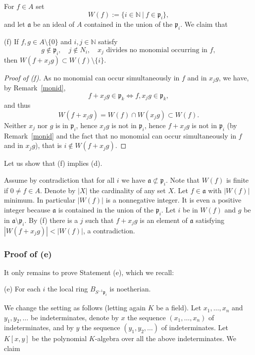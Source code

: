 \documentclass[parskip=half,fontsize=12pt]{scrartcl}%
\newcommand{\mf}{\mathfrak}
\newcommand{\aaa}{\mf a}
\newcommand{\ppp}{\mf p}
\begin{document}
For $f\in A$ set 
$$
W(f):=\{i\in\mathbb N\ |\ f\in\ppp_i\},
$$ 
and let $\aaa$ be an ideal of $A$ contained in the union of the $\ppp_i$. %
We claim that 

(f) If $f,g\in A\setminus\{0\}$ and $i,j\in\mathbb N$ satisfy 
$$
g\notin\ppp_i,\quad j\notin N_i,\quad x_j\text{ divides no monomial occurring in }f,
$$ 
then $W(f+x_jg)\subset W(f)\setminus\{i\}$. %

\begin{proof}[Proof of (f)]
As no monomial can occur simultaneously in $f$ and in $x_jg$, we have, by Remark~\ref{monid}, 
$$
f+x_jg\in\ppp_k\iff f,x_jg\in\ppp_k,
$$
and thus 
$$
W(f+x_jg)=W(f)\cap W(x_jg)\subset W(f).
$$  
Neither $x_j$ nor $g$ is in $\ppp_i$, hence $x_jg$ is not in $\ppp_i$, hence $f+x_jg$ is not in $\ppp_i$ (by Remark~\ref{monid} and the fact that no monomial can occur simultaneously in $f$ and in $x_jg$), that is $i\notin W(f+x_jg)$.
\end{proof}

Let us show that (f) implies (d). 

Assume by contradiction that for all $i$ we have $\aaa\not\subset\ppp_i$. Note that $W(f)$ is finite if $0\ne f\in A$. Denote by $|X|$ the cardinality of any set $X$. Let $f\in\aaa$ with $|W(f)|$ minimum. In particular $|W(f)|$ is a nonnegative integer. It is even a positive integer because $\aaa$ is contained in the union of the $\ppp_i$. Let $i$ be in $W(f)$ and $g$ be in $\aaa\setminus\ppp_i$. By (f) there is a $j$ such that $f+x_jg$ is an element of $\aaa$ satisfying $|W(f+x_jg)|<|W(f)|$, a contradiction.

\subsubsection{Proof of (e)}

It only remains to prove Statement (e), which we recall:

(e) For each $i$ the local ring $B_{S^{-1}\ppp_i}$ is noetherian.

We change the setting as follows (letting again $K$ be a field). Let $x_1,\ldots,x_n$ and $y_1,y_2,\ldots$ be indeterminates, denote by $x$ the sequence $(x_1,\ldots,x_n)$ of indeterminates, and by $y$ the sequence $(y_1,y_2,\ldots)$ of indeterminates. Let $K[x,y]$ be the polynomial $K$-algebra over all the above indeterminates. We claim 
\end{document}

